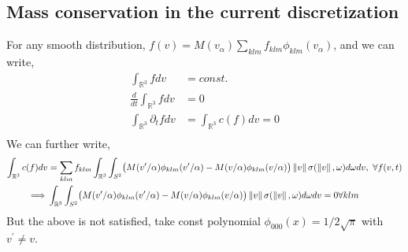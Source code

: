 \documentclass{article}
\newcommand{\RR}{\mathbb{R}}
\begin{document}
\subsection{Mass conservation in the current discretization}
For any smooth distribution, $f(v) = M(v_\alpha) \sum_{klm} f_{klm} \phi_{klm}(v_\alpha)$, and we can write, 
\begin{align}
    \int_{\RR^3} f dv &= const.  \\
    \frac{d}{dt} \int_{\RR^3} f dv &= 0  \\
    \int_{\RR^3} \partial_t f  dv &= \int_{\RR^3} c(f) dv =0 \\
\end{align}
We can further write, 
\begin{align}
    \int_{\RR^3} c(f) dv  &= \sum_{klm} f_{klm} \int_{\RR^3}\int_{S^2} \bigl( M(v^\prime/\alpha) \phi_{klm}(v^\prime/\alpha) -   M(v/\alpha) \phi_{klm}(v/\alpha) \bigr) \norm{v} \sigma(\norm{v},\omega) d\omega dv, \  \forall f(v,t) \\
    \implies & \int_{\RR^3}\int_{S^2} \bigl( M(v^\prime/\alpha) \phi_{klm}(v^\prime/\alpha) -   M(v/\alpha) \phi_{klm}(v/\alpha) \bigr) \norm{v} \sigma(\norm{v},\omega) d\omega dv =0  \forall klm
\end{align}
But the above is not satisfied, take const polynomial $\phi_{000}(x)=1/2\sqrt{\pi}$ with $v^\prime \neq v$.  



        
\end{document}
